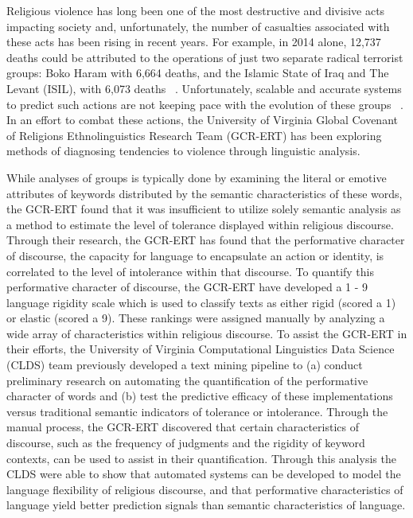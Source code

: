 \documentclass[11pt]{article}
\begin{document}
Religious violence has long been one of the most destructive and divisive acts impacting society and, unfortunately, the number of casualties associated with these acts has been rising in recent years. For example, in 2014 alone, 12,737 deaths could be attributed to the operations of just two separate radical terrorist groups: Boko Haram with 6,664 deaths, and the Islamic State of Iraq and The Levant (ISIL), with 6,073 deaths ~\cite{Searcey2015}. Unfortunately, scalable and accurate systems to predict such actions are not keeping pace with the evolution of these groups ~\cite{Yang2010}. In an effort to combat these actions, the University of Virginia Global Covenant of Religions Ethnolinguistics Research Team (GCR-ERT) has been exploring methods of diagnosing tendencies to violence through linguistic analysis.

While analyses of groups is typically done by examining the literal or emotive attributes of keywords distributed by the semantic characteristics of these words, the GCR-ERT found that it was insufficient to utilize solely semantic analysis as a method to estimate the level of tolerance displayed within religious discourse. Through their research, the GCR-ERT has found that the performative character of discourse, the capacity for language to encapsulate an action or identity, is correlated to the level of intolerance within that discourse. To quantify this performative character of discourse, the GCR-ERT have developed a 1 - 9 language rigidity scale which is used to classify texts as either rigid (scored a 1) or elastic (scored a 9). These rankings were assigned manually by analyzing a wide array of characteristics within religious discourse. To assist the GCR-ERT in their efforts, the University of Virginia Computational Linguistics Data Science (CLDS) team previously developed a text mining pipeline to (a) conduct preliminary research on automating the quantification of the performative character of words and (b) test the predictive efficacy of these implementations versus traditional semantic indicators of tolerance or intolerance. Through the manual process, the GCR-ERT discovered that certain characteristics of discourse, such as the frequency of judgments and the rigidity of keyword contexts, can be used to assist in their quantification. Through this analysis the CLDS were able to show that automated systems can be developed to model the language flexibility of religious discourse, and that performative characteristics of language yield better prediction signals than semantic characteristics of language.
\end{document}
